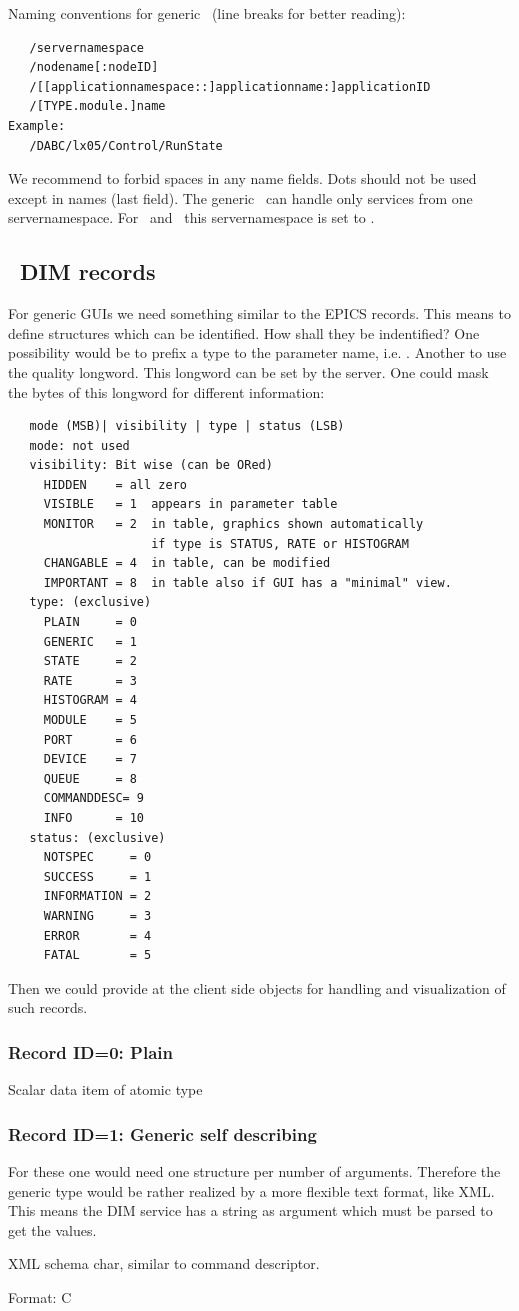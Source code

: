 Naming conventions for generic \gui\ (line breaks for better reading):
{\small \begin{verbatim}
   /servernamespace
   /nodename[:nodeID]
   /[[applicationnamespace::]applicationname:]applicationID
   /[TYPE.module.]name
Example:
   /DABC/lx05/Control/RunState
\end{verbatim}
}
We recommend to forbid spaces in any name fields. Dots should not be used except in names (last field). The generic \gui\ can handle only services from one servernamespace. For \dabc\ and \mbs\ this servernamespace is set to .
\subsection{\dabc\ DIM records}
For generic GUIs we need something similar to the EPICS records. This means to define structures which can be identified. How shall they be indentified? One possibility would be to prefix a type to the parameter name, i.e. . Another to use the quality longword. This longword can be set by the server. One could mask the bytes of this longword for different information:
{\small \begin{verbatim}
   mode (MSB)| visibility | type | status (LSB)
   mode: not used
   visibility: Bit wise (can be ORed)
     HIDDEN    = all zero
     VISIBLE   = 1  appears in parameter table
     MONITOR   = 2  in table, graphics shown automatically 
                    if type is STATUS, RATE or HISTOGRAM
     CHANGABLE = 4  in table, can be modified
     IMPORTANT = 8  in table also if GUI has a "minimal" view.
   type: (exclusive)
     PLAIN     = 0
     GENERIC   = 1
     STATE     = 2
     RATE      = 3
     HISTOGRAM = 4
     MODULE    = 5
     PORT      = 6
     DEVICE    = 7
     QUEUE     = 8
     COMMANDDESC= 9
     INFO      = 10
   status: (exclusive) 
     NOTSPEC     = 0
     SUCCESS     = 1
     INFORMATION = 2
     WARNING     = 3
     ERROR       = 4
     FATAL       = 5
\end{verbatim}
}

Then we could provide at the client side objects for handling and visualization of such records.

\subsubsection{Record ID=0: Plain}

Scalar data item of atomic type

\subsubsection{Record ID=1: Generic self describing}
For these one would need one structure per number of arguments. Therefore the generic type would be rather realized by a more flexible text format, like XML. This means the DIM service has a string as argument which must be parsed to get the values.
\begin{compactdesc}
\item[XML schema] char, similar to command descriptor.
\item[Format:] C
\end{compactdesc}

